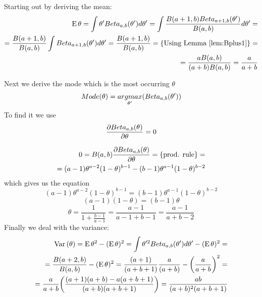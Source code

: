 \documentclass[a4paper,twoside=false,abstract=false,numbers=noenddot,
titlepage=false,headings=small,parskip=half,version=last]{scrartcl}
\begin{document}
\begin{solution}
    Starting out by deriving the mean: 
    \begin{equation}
        \begin{split}
            {\rm E}\,\theta = \int\theta'Beta_{a,b}(\theta')d\theta' =
            \int\frac{B(a+1,b)Beta_{a+1,b}(\theta')}{B(a,b)}d\theta' = \\
            = \frac{B(a+1,b)}{B(a,b)}\int{Beta_{a+1,b}(\theta')d\theta'} =
            \frac{B(a+1,b)}{B(a,b)} = \{\text{Using Lemma \ref{lem:Bplus1}}\}=\\
            =\frac{aB(a,b)}{(a+b)B(a,b)}=\frac{a}{a+b}
        \end{split}
    \end{equation}
    
    Next we derive the mode which is the most occurring $\theta$
    \begin{equation}
        Mode(\theta)=\underset{\theta'}{argmax}(Beta_{a,b}(\theta'))
    \end{equation}
    To find it we use
    \begin{equation}
        \frac{\partial{Beta_{a,b}(\theta)}}{\partial{\theta}}=0
    \end{equation}

    \begin{equation}
        \begin{split}
            0=B(a,b)\frac{\partial{Beta_{a,b}(\theta)}}{\partial{\theta}}=\{\text{prod. rule}\}= \\
            =(a-1)\theta^{a-2}(1-\theta)^{b-1}-(b-1)\theta^{a-1}(1-\theta)^{b-2}
        \end{split}
    \end{equation}
    which gives us the equation
    \begin{equation}
        (a-1)\theta^{a-2}(1-\theta)^{b-1}=(b-1)\theta^{a-1}(1-\theta)^{b-2}
    \end{equation}
    \begin{equation}
        (a-1)(1-\theta)=(b-1)\theta 
    \end{equation}
    \begin{equation}
        \theta=\frac{1}{1+\frac{b-1}{a-1}}=\frac{a-1}{a-1+b-1}=\frac{a-1}{a+b-2} 
    \end{equation}
    Finally we deal with the variance:
    \begin{equation}
        \begin{split}
            {\rm Var}\,(\theta)={\rm E}\,\theta^2 - ({\rm E}\,\theta)^2=
            \int\theta'^2 Beta_{a,b}(\theta')d\theta' - ({\rm E}\,\theta)^2= \\
            = \frac{B(a+2,b)}{B(a,b)} - ({\rm E}\,\theta)^2 =
            \frac{(a+1)}{(a+b+1)}\frac{a}{(a+b)} - \bigg(\frac{a}{a+b}\bigg)^2 =
            \\
            = \frac{a}{a+b}\bigg(\frac{(a+1)(a+b)-a(a+b+1)}{(a+b)(a+b+1)}\bigg)
            = \frac{ab}{(a+b)^2(a+b+1)}
        \end{split}    
    \end{equation}

\end{solution}
\end{document}
